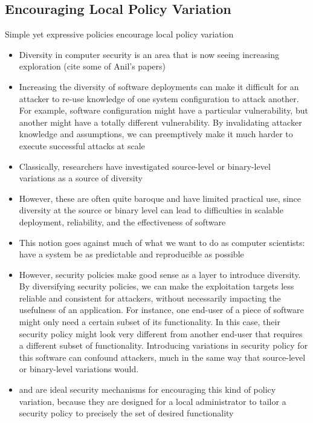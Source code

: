 \subsection{Encouraging Local Policy Variation}

\begin{inprogress}
  Simple yet expressive policies encourage local policy variation
  \begin{itemize}
    \item Diversity in computer security is an area that is now seeing increasing exploration (cite some of Anil's papers)
    \item Increasing the diversity of software deployments can make it difficult for an attacker to re-use knowledge of one
    system configuration to attack another. For example, software configuration might have a particular vulnerability, but
    another might have a totally different vulnerability. By invalidating attacker knowledge and assumptions, we can preemptively
    make it much harder to execute successful attacks at scale

    \item Classically, researchers have investigated source-level or binary-level variations as a source of diversity
    \item However, these are often quite baroque and have limited practical use, since diversity at the source or binary level can
    lead to difficulties in scalable deployment, reliability, and the effectiveness of software
    \item This notion goes against much of what we want to do as computer scientists: have a system be as predictable and reproducible as possible

    \item However, security policies make good sense as a layer to introduce diversity. By diversifying security policies, we can
    make the exploitation targets less reliable and consistent for attackers, without necessarily impacting the usefulness of an application.
    For instance, one end-user of a piece of software might only need a certain subset of its functionality. In this case, their security policy
    might look very different from another end-user that requires a different subset of functionality. Introducing variations in security policy
    for this software can confound attackers, much in the same way that source-level or binary-level variations would.
    \item \bpfbox{} and \bpfcontain{} are ideal security mechanisms for encouraging this kind of policy variation,
    because they are designed for a local administrator to tailor a security policy to precisely the set of desired functionality
  \end{itemize}
\end{inprogress}

